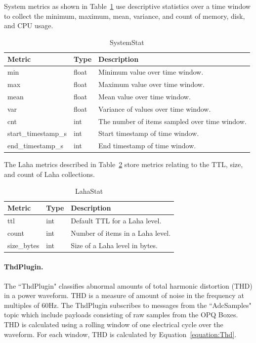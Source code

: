System metrics as shown in Table~\ref{table:MetricsSystemStat} use descriptive statistics over a time window to collect the minimum, maximum, mean, variance, and count of memory, disk, and CPU usage.

\begin{table}[H]
	\centering
	\caption{SystemStat}
	\begin{tabularx}{\textwidth}{llX}
		\toprule
		\textbf{Metric} & \textbf{Type} & \textbf{Description} \\
		\midrule
		min & float & Minimum value over time window. \\
		max & float & Maximum value over time window. \\
		mean & float & Mean value over time window. \\
		var & float & Variance of values over time window. \\
		cnt & int & The number of items sampled over time window. \\
		start\_timestamp\_s & int & Start timestamp of time window. \\
		end\_timestamp\_s & int & End timestamp of time window. \\
		\bottomrule
	\end{tabularx}
	\label{table:MetricsSystemStat}
\end{table}


The Laha metrics described in Table~\ref{table:MetricsLaha} store metrics relating to the TTL, size, and count of Laha collections.

\begin{table}[H]
	\centering
	\caption{LahaStat}
	\begin{tabularx}{\textwidth}{llX}
		\toprule
		\textbf{Metric} & \textbf{Type} & \textbf{Description} \\
		\midrule
		ttl & int & Default TTL for a Laha level. \\
		count & int & Number of items in a Laha level. \\
		size\_bytes & int & Size of a Laha level in bytes. \\
		\bottomrule
	\end{tabularx}
	\label{table:MetricsLaha}
\end{table}

\paragraph{ThdPlugin.}
The ``ThdPlugin" classifies abnormal amounts of total harmonic distortion (THD) in a power waveform. THD is a measure of amount of noise in the frequency at multiples of 60Hz. The ThdPlugin subscribes to messages from the ``AdcSamples" topic which include payloads consisting of raw samples from the OPQ Boxes. THD is calculated using a rolling window of one electrical cycle over the waveform. For each window, THD is calculated by Equation~\ref{equation:Thd}.

